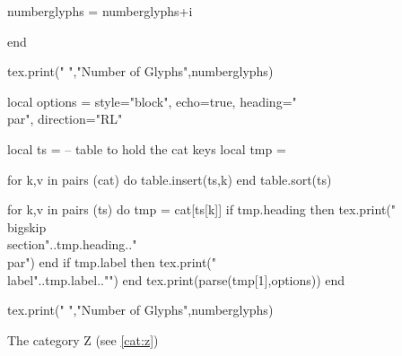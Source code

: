 \documentclass{article}
\begin{document}
\begin{luacode*}
numberglyphs = numberglyphs+i

end

tex.print(" ","Number of Glyphs",numberglyphs)




local options = {style="block",
                 echo=true,
                 heading="\\par",
                 direction="RL"}

local ts = {} -- table to hold the cat keys
local tmp = {}


for k,v in pairs (cat) do
   table.insert(ts,k)
end
table.sort(ts)

for k,v in pairs (ts) do
  tmp = cat[ts[k]]
  if tmp.heading then tex.print("{\\bigskip\\section{"..tmp.heading.."}}\\par") end
  if tmp.label then tex.print("\\label{"..tmp.label.."}") end
  tex.print(parse(tmp[1],options))
end


tex.print(" ","Number of Glyphs",numberglyphs)
\end{luacode*}

The category Z (see \ref{cat:z})
\end{document}
